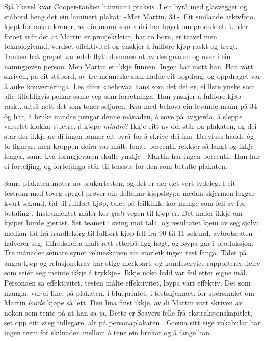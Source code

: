 Sjå likevel kvar Cooper-tanken hamnar i praksis. I eit byrå med glasvegger og ståbord heng det ein laminert plakat: «Møt Martin, 34». Eit smilande arkivfoto, kjøpt for nokre kroner, av ein mann som aldri har høyrt om produktet. Under fotoet står det at Martin er prosjektleiar, har to born, er travel men teknologivand, verdset effektivitet og ynskjer å fullføre kjøp raskt og trygt. Tanken bak grepet var edel: flytt dommen ut av designaren og over i ein namngjeven person. Men Martin er ikkje funnen. Ingen har møtt han. Han vart skriven, på eit ståbord, av tre menneske som hadde eit oppdrag, og oppdraget var å auke konverteringa. Les difor «behova» hans som det dei er, ei liste ynske som alle tilfeldigvis peikar same veg som forretninga. Han ynskjer å fullføre kjøp raskt, altså nett det som tener seljaren. Kva med behova ein levande mann på 34 òg har, å bruke mindre pengar denne månaden, å sove på avgjerda, å sleppe varselet klokka tjuetre, å kjøpe \emph{mindre}? Ikkje eitt av dei står på plakaten, og dei står der ikkje av di ingen lønner eit byrå for å skrive dei inn. Dreyfuss hadde òg to figurar, men kroppen deira var målt: femte percentil rekkjer så langt og ikkje lenger, same kva formgjevaren skulle ynskje \autocite{dreyfuss1960measure}. Martin har ingen percentil. Han har ei forteljing, og forteljinga står til teneste for den som betalte plakaten.

Same plakaten møter no brukartesten, og det er der det vert tydeleg. I eit testrom med toveg-spegel prøver ein deltakar kjøpsløypa medan skjermen loggar kvart sekund, tid til fullført kjøp, talet på feilklikk, kor mange som fell av før betaling \autocite{nielsen1993}. Instrumentet måler kor \emph{glatt} vegen til kjøp er. Det måler ikkje om kjøpet burde gjerast. Set teamet i sving mot tala, og resultatet kjem av seg sjølv: median tid frå handlekorg til fullført kjøp fell frå 90 til 11 sekund, avbrotsraten halverer seg, tilfredsheita målt rett etterpå ligg høgt, og løypa går i produksjon. Tre månader seinare syner rekneskapen ein storleik ingen test fanga. Talet på angra kjøp og refusjonskrav har stige merkbart, og kundeservice rapporterer fleire som seier «eg meinte ikkje å trykkje». Ikkje noko ledd var feil etter eigne mål. Personaen sa effektivitet, testen målte effektivitet, løypa vart effektiv. Det som mangla, var ei line, på plakaten, i blueprintet, i testskjemaet, for spørsmålet om Martin \emph{burde} kjøpe så lett. Den lina finst ikkje, av di Martin vart skriven av nokon som tente på at han sa ja. Dette er Seavers felle frå ekstraksjonskapitlet, set opp eitt steg tidlegare, alt på personaplakaten \autocite{seaver2019captivating}. Greina sitt eige vokabular har ingen term for skilnaden mellom å tene ein brukar og å fange han.


